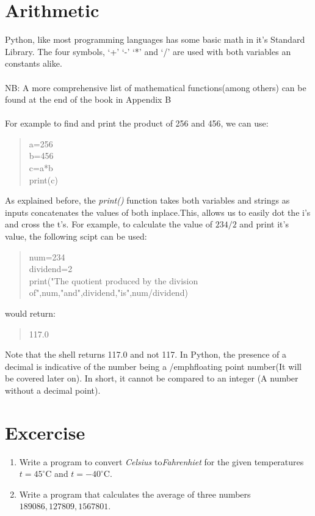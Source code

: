 \section{Arithmetic}
Python, like most programming languages has some basic math in it's Standard Library. The four symbols, `+' `-' `*' and `/' are used with both variables an constants alike.
\\ \\ NB: A more comprehensive list of mathematical functions(among others) can be found at the end of the book in Appendix B\\ \\
 For example to find and print the product of 256 and 456, we can use:
\begin{quote}
a=256\\b=456\\c=a*b\\print(c)
\end{quote}
As explained before, the  \emph{print()} function takes both variables and strings as inputs concatenates the values of both inplace.This, allows us to easily dot the i's and cross the t's. For example, to calculate the value of $234/2$ and print it's value, the following scipt can be used:

\begin{quote}
num=234\\
dividend=2\\
print("The quotient produced by the division of",num,"and",dividend,"is",num/dividend)
\end{quote}
would return:
\begin{quote}
117.0
\end{quote}

Note that the shell returns 117.0 and not 117. In Python, the presence of a decimal is indicative of the number being a /emph{floating point} number(It will be covered later on). In short, it cannot be compared to an integer (A number without a decimal point).
\newpage	
\section{Excercise}
\begin{enumerate}
\item Write a program to convert \emph{Celsius} to\emph{Fahrenhiet} for the given temperatures $t=45^{\circ}$C and $t=-40^{\circ}$C.
\item Write a program that calculates the average of three numbers $189086,127809,1567801$.
\end{enumerate}

